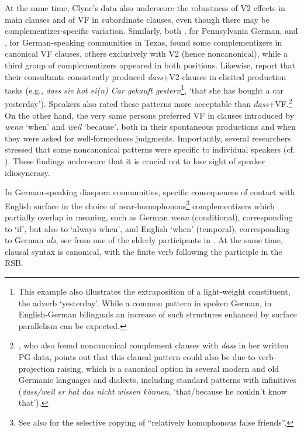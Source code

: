 \documentclass[output=paper]{langscibook}
\begin{document}
At the same time, Clyne’s data also underscore the robustness of V2 effects in main clauses and of VF in subordinate clauses, even though there may be complementizer-specific variation. Similarly, both \citet{Louden2008}, for Pennsylvania German, and \citet{Boas2009b, Boas2009a}, for German-speaking communities in Texas, found some complementizers in canonical VF clauses, others exclusively with V2 (hence noncanonical), while a third group of complementizers appeared in both positions. Likewise, \citet[29]{HoppPutnam2015} report that their consultants consistently produced \textit{dass}+V2-clauses in elicited production tasks (e.g., \textit{dass sie hot ei(n) Car gekauft gestern}\footnote{This example also illustrates the extraposition of a light-weight constituent, the adverb ‘yesterday’. While a common pattern in spoken German, in English-German bilinguals an increase of such structures enhanced by surface parallelism can be expected.}, ‘that she has bought a car yesterday’). Speakers also rated these patterns more acceptable than \textit{dass}+VF.\footnote{\citet{Stolberg2015}, who also found noncanonical complement clauses with \textit{dass} in her written PG data, points out that this clausal pattern could also be due to verb-projection raising, which is a canonical option in several modern and old Germanic languages and dialects, including standard patterns with infinitives (\textit{dass/weil er hat das nicht wissen können}, ‘that/because he couldn’t know that’).} On the other hand, the very same persons preferred VF in clauses introduced by \textit{wenn} ‘when’ and \textit{weil} ‘because’, both in their spontaneous productions and when they were asked for well-formedness judgments. Importantly, several researchers stressed that some noncanonical patterns were specific to individual speakers (cf. \citealt{Boas2009b, Boas2009a, Clyne2003, HoppPutnam2015}). These findings underscore that it is crucial not to lose sight of speaker idiosyncrasy.

\begin{sloppypar}
In German-speaking diaspora communities, specific consequences of contact with English surface in the choice of near-homophonous\footnote{See also \citet[292]{Johanson2002} for the selective copying of “relatively homophonous false friends”.} complementizers which partially overlap in meaning, such as German \textit{wenn} (conditional), corresponding to ‘if’, but also to ‘always when’, and English ‘when’ (temporal), corresponding to German \textit{als}, see  from one of the elderly participants in \citet{HoppPutnam2015}. At the same time, clausal syntax is canonical, with the finite verb following the participle in the RSB.
\end{sloppypar}
\end{document}
